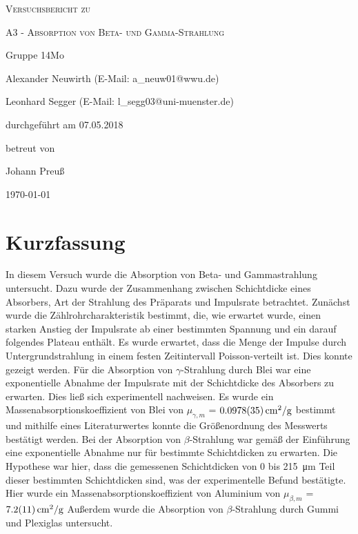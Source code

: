 \documentclass[
	a4paper,
	12pt,
	pagesize,
	ngerman
]{scrartcl}
\begin{document}
	
	\begin{titlepage}
		\centering
		{\scshape\LARGE Versuchsbericht zu \par}
		\vspace{1cm}
		{\scshape\huge A3 - Absorption von Beta- und Gamma-Strahlung \par}
		\vspace{2.5cm}
		{\LARGE Gruppe 14Mo \par}
		\vspace{0.5cm}
		
		{\large Alexander Neuwirth (E-Mail: a\_neuw01@wwu.de) \par}
		{\large Leonhard Segger (E-Mail: l\_segg03@uni-muenster.de) \par}
		\vfill
		
		durchgeführt am 07.05.2018\par
		betreut von\par
		{\large Johann Preuß}  
		
		\vfill
		
		{\large \today\par}
	\end{titlepage}
	\tableofcontents
	\newpage

	\section{Kurzfassung}
	In diesem Versuch wurde die Absorption von Beta- und Gammastrahlung untersucht. %
	Dazu wurde der Zusammenhang zwischen Schichtdicke eines Absorbers, Art der Strahlung des Präparats und Impulsrate betrachtet.
	Zunächst wurde die Zählrohrcharakteristik bestimmt, die, wie erwartet wurde, einen starken Anstieg der Impulsrate ab einer bestimmten Spannung und ein darauf folgendes Plateau enthält.
	Es wurde erwartet, dass die Menge der Impulse durch Untergrundstrahlung in einem festen Zeitintervall Poisson-verteilt ist.
	Dies konnte gezeigt werden.
	Für die Absorption von $\gamma$-Strahlung durch Blei war eine exponentielle Abnahme der Impulsrate mit der Schichtdicke des Absorbers zu erwarten.
	Dies ließ sich experimentell nachweisen.
	Es wurde ein Massenabsorptionskoeffizient von Blei von $\mu_{\gamma,m}$ = $\SI{0,0978+-0,0035}{cm^2/g}$ bestimmt und mithilfe eines Literaturwertes konnte die Größenordnung des Messwerts bestätigt werden.
	Bei der Absorption von $\beta$-Strahlung war gemäß der Einführung  eine exponentielle Abnahme nur für bestimmte Schichtdicken zu erwarten. \cite{Einfuehrung}
	Die Hypothese war hier, dass die gemessenen Schichtdicken von 0 bis \SI{215}{\micro \meter} Teil dieser bestimmten Schichtdicken sind, was der experimentelle Befund bestätigte.
	Hier wurde ein Massenabsorptionskoeffizient von Aluminium von $\mu_{\beta,m}$ = $\SI{7,2+-1,1}{cm^2/g}$
	Außerdem wurde die Absorption von $\beta$-Strahlung durch Gummi und Plexiglas untersucht.
	
\end{document}
